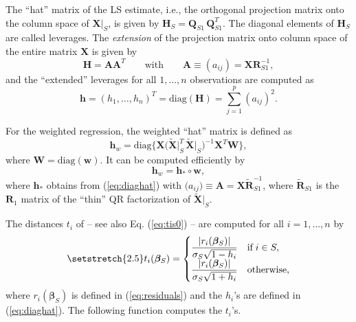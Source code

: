 \documentclass[a4paper,oneside,11pt,DIV=12]{scrartcl}
\begin{document}
The ``hat'' matrix of the LS estimate, i.e., the orthogonal projection
matrix onto the column space of $\bm X \vert_S$, is given by
$\bm H_S = \bm Q_{S1} \, \bm Q_{S1}^T$. The diagonal elements of
$\bm H_S$ are called leverages. The \textit{extension} of the projection
matrix onto column space of the entire matrix $\bm X$ is given by
\begin{equation*}
	\bm H = \bm A \bm A^T \qquad \text{with} \qquad \bm A
		\equiv (a_{ij})= \bm X \bm R_{S1}^{-1},
\end{equation*}
\noindent and the ``extended'' leverages for all $1, \ldots, n$
observations are computed as
\begin{equation}\label{eq:diaghat}
	\bm h = (h_1, \ldots, h_n)^T = \mathrm{diag}(\bm H) =
		\sum_{j = 1}^p (a_{ij})^2.
\end{equation}

\noindent For the weighted regression, the weighted ``hat'' matrix
is defined as \citep{li_valliant_2009}
\begin{equation}
	\bm h_w = \mathrm{diag}\Big\{\bm X\big( \widetilde{\bm X}\vert_S^T \,
		\widetilde{\bm X}\vert_S \big)^{-1} \bm X^T \bm W\Big\},
\end{equation}
\noindent where $\bm W = \mathrm{diag}(\bm w)$. It can be computed
efficiently by
\begin{equation}\label{eq:diaghatw}
	\bm h_w = \bm h_* \circ \bm w,
\end{equation}
\noindent where $\bm h_*$ obtains from  (\ref{eq:diaghat}) with
$\bm (a_{ij}) \equiv \bm A = \bm X \widetilde{\bm R}_{S1}^{-1}$, where
$\widetilde{\bm R}_{S1}$ is the $\bm R_1$ matrix of the ``thin'' QR
factorization of $\widetilde{\bm X}\vert_S$.

The distances $t_i$ of \citet[][p. 288]{billor_hadi_etal_2000} --
see also Eq. (\ref{eq:tis0}) -- are computed for all $i=1,\ldots,n$ by
\begin{equation}\label{eq:tis}
	\setstretch{2.5}
	t_i(\bm \beta_S) = \begin{cases}
		\displaystyle{\frac{\vert r_i(\bm \beta_S) \vert}
			{\sigma_S \sqrt{1 - h_i}}} & \text{if} \; i \in S, \\
		\displaystyle{\frac{\vert r_i(\bm \beta_S) \vert}
			{\sigma_S \sqrt{1 + h_i}}} & \text{otherwise},
	\end{cases}
\end{equation}
\noindent where $r_i(\bm \beta_S)$ is defined in (\ref{eq:residuals})
and the $h_i$'s are defined in (\ref{eq:diaghat}). The following function
computes the $t_i$'s.
\end{document}
